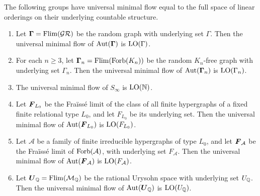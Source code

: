 \begin{theorem}
\label{thm:umf-full-ordering-space}
The following groups have universal minimal flow equal to the full space of linear orderings on their underlying countable structure.
\begin{enumerate}
    \item[(i)] Let \(\boldsymbol{\Gamma}=\operatorname{Flim}(\mathcal{GR})\) be the random graph with underlying set \(\Gamma\). Then the universal minimal flow of \(\operatorname{Aut}(\boldsymbol{\Gamma})\) is \(\operatorname{LO}(\Gamma)\).

    \item[(ii)] For each \(n\geq 3\), let \(\boldsymbol{\Gamma}_n=\operatorname{Flim}(\operatorname{Forb}(K_n))\) be the random \(K_n\)-free graph with underlying set \(\Gamma_n\). Then the universal minimal flow of \(\operatorname{Aut}(\boldsymbol{\Gamma}_n)\) is \(\operatorname{LO}(\Gamma_n)\).

    \item[(iii)] The universal minimal flow of \(S_\infty\) is \(\operatorname{LO}(\mathbb{N})\).

    \item[(iv)] Let \(\boldsymbol{F}_{L_0}\) be the Fraïssé limit of the class of all finite hypergraphs of a fixed finite relational type \(L_0\), and let \(F_{L_0}\) be its underlying set. Then the universal minimal flow of \(\operatorname{Aut}(\boldsymbol{F}_{L_0})\) is \(\operatorname{LO}(F_{L_0})\).

    \item[(v)] Let \(\mathcal A\) be a family of finite irreducible hypergraphs of type \(L_0\), and let \(\boldsymbol{F}_{\mathcal A}\) be the Fraïssé limit of \(\operatorname{Forb}(\mathcal A)\), with underlying set \(F_{\mathcal A}\). Then the universal minimal flow of \(\operatorname{Aut}(\boldsymbol{F}_{\mathcal A})\) is \(\operatorname{LO}(F_{\mathcal A})\).

    \item[(vi)] Let \(\boldsymbol{U}_{\mathbb{Q}}=\operatorname{Flim}(\mathcal M_{\mathbb{Q}})\) be the rational Urysohn space with underlying set \(U_{\mathbb{Q}}\). Then the universal minimal flow of \(\operatorname{Aut}(\boldsymbol{U}_{\mathbb{Q}})\) is \(\operatorname{LO}(U_{\mathbb{Q}})\).
\end{enumerate}
\end{theorem}

